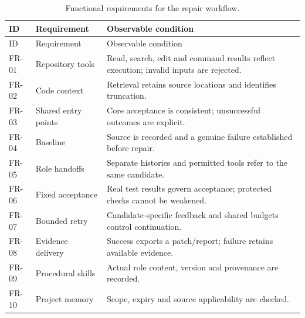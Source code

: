 \begin{longtable}[]{@{}
  >{\raggedright\arraybackslash}p{}
  >{\raggedright\arraybackslash}p{}
  >{\raggedright\arraybackslash}p{}@{}}
\caption[Functional requirements]{Functional requirements for the repair workflow.}\label{tab:3-2}\tabularnewline
\toprule\noalign{}
\begin{minipage}[b]{\linewidth}\raggedright
ID
\end{minipage} & \begin{minipage}[b]{\linewidth}\raggedright
Requirement
\end{minipage} & \begin{minipage}[b]{\linewidth}\raggedright
Observable condition
\end{minipage} \\
\midrule\noalign{}
\endfirsthead
\toprule\noalign{}
\begin{minipage}[b]{\linewidth}\raggedright
ID
\end{minipage} & \begin{minipage}[b]{\linewidth}\raggedright
Requirement
\end{minipage} & \begin{minipage}[b]{\linewidth}\raggedright
Observable condition
\end{minipage} \\
\midrule\noalign{}
\endhead
\bottomrule\noalign{}
\endlastfoot
FR-01 & Repository tools & Read, search, edit and command results reflect execution; invalid inputs are rejected. \\
FR-02 & Code context & Retrieval retains source locations and identifies truncation. \\
FR-03 & Shared entry points & Core acceptance is consistent; unsuccessful outcomes are explicit. \\
FR-04 & Baseline & Source is recorded and a genuine failure established before repair. \\
FR-05 & Role handoffs & Separate histories and permitted tools refer to the same candidate. \\
FR-06 & Fixed acceptance & Real test results govern acceptance; protected checks cannot be weakened. \\
FR-07 & Bounded retry & Candidate-specific feedback and shared budgets control continuation. \\
FR-08 & Evidence delivery & Success exports a patch/report; failure retains available evidence. \\
FR-09 & Procedural skills & Actual role content, version and provenance are recorded. \\
FR-10 & Project memory & Scope, expiry and source applicability are checked. \\
\end{longtable}

